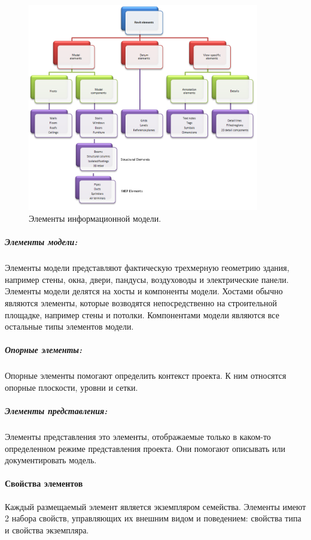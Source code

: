 \begin{figure}[ht]
    \centering
    \includegraphics[width=0.9\textwidth]{images/Revit-elements.png}
    \caption{Элементы информационной модели.%
    \cite{DocRevit}}
    \label{figure:RevitElements}
\end{figure}

\subparagraph{Элементы модели:}

Элементы модели представляют фактическую трехмерную геометрию здания,
например стены, окна, двери, пандусы,
воздуховоды и электрические панели.
Элементы модели делятся на хосты и компоненты модели.
Хостами обычно являются элементы,
которые возводятся непосредственно на строительной площадке,
например стены и потолки.
Компонентами модели являются все остальные типы элементов модели.

\subparagraph{Опорные элементы:}

Опорные элементы помогают определить контекст проекта.
К ним относятся опорные плоскости, уровни и сетки.

\subparagraph{Элементы представления:}

Элементы представления это элементы,
отображаемые только в каком-то определенном режиме представления проекта.
Они помогают описывать или документировать модель.

\paragraph{Свойства элементов}

Каждый размещаемый элемент является экземпляром семейства.
Элементы имеют 2 набора свойств, управляющих их внешним видом и поведением:
свойства типа и свойства экземпляра.%
\cite{DocRevit}

